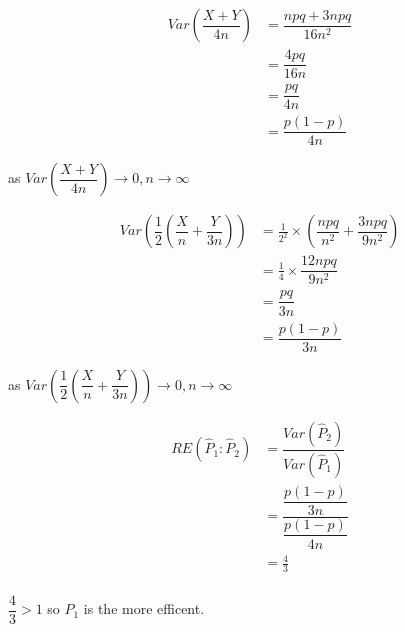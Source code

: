 \begin{example}
\begin{step}
    \begin{align*}
        Var\left(\dfrac{X + Y}{4n}\right) &= \dfrac{npq + 3npq}{16n^2}      \\
        &= \dfrac{4pq}{16n}                                                 \\
        &= \dfrac{pq}{4n}                                                   \\
        &= \dfrac{p(1-p)}{4n}
    \end{align*}

    \begin{center}
    as $Var\left(\dfrac{X + Y}{4n}\right) \rightarrow 0, n \rightarrow \infty$
    \end{center}

    \begin{align*}
        Var\left(\dfrac{1}{2}\left(\dfrac{X}{n} + \dfrac{Y}{3n}\right)\right) &= \frac{1}{2^2} \times \left(\dfrac{npq}{n^2}+\dfrac{3npq}{9n^2}\right)        \\
        &= \frac{1}{4} \times \dfrac{12npq}{9n^2}   \\
        &= \dfrac{pq}{3n}                           \\
        &= \dfrac{p(1-p)}{3n}
    \end{align*}

    \begin{center}
    as $Var\left(\dfrac{1}{2}\left(\dfrac{X}{n} + \dfrac{Y}{3n}\right)\right) \rightarrow 0, n \rightarrow \infty$
    \end{center}

    \begin{align*}
    RE(\hat{P}_1 : \hat{P}_2) &= \dfrac{Var(\hat{P}_2)}{Var(\hat{P}_1)}  \\
    &= \dfrac{\dfrac{p(1-p)}{3n}}{\dfrac{p(1-p)}{4n}}                               \\
    &= \frac{4}{3}                                                                  \\
    \end{align*}

    $\dfrac{4}{3} > 1$ so $\hat{P}_1$ is the more efficent.

    \end{step}

    \end{example}
    
